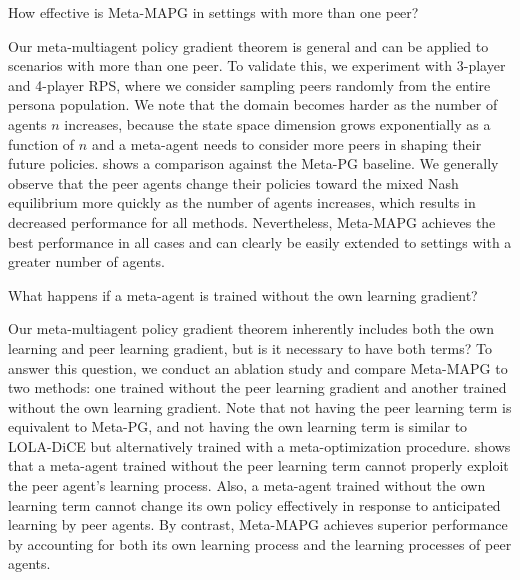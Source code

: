 \begin{question}
How effective is Meta-MAPG in settings with more than one peer?
\\[-2em]
\end{question}
Our meta-multiagent policy gradient theorem is general and can be applied to scenarios with more than one peer.
To validate this, we experiment with 3-player and 4-player RPS, where we consider sampling peers randomly from the entire persona population. 
We note that the domain becomes harder as the number of agents $n$ increases, because the state space dimension grows exponentially as a function of $n$ and a meta-agent needs to consider more peers in shaping their future policies. 
 shows a comparison against the Meta-PG baseline. 
We generally observe that the peer agents change their policies toward the mixed Nash equilibrium more quickly as the number of agents increases, which results in decreased performance for all methods. 
Nevertheless, Meta-MAPG achieves the best performance in all cases and can clearly be easily extended to settings with a greater number of agents.

\begin{question}
What happens if a meta-agent is trained without the own learning gradient?
\\[-2em]
\end{question}
Our meta-multiagent policy gradient theorem inherently includes both the own learning and peer learning gradient, but is it necessary to have both terms?
To answer this question, we conduct an ablation study and compare Meta-MAPG to two methods: one trained without the peer learning gradient and another trained without the own learning gradient. 
Note that not having the peer learning term is equivalent to Meta-PG, and not having the own learning term is similar to LOLA-DiCE but alternatively trained with a meta-optimization procedure.  shows that a meta-agent trained without the peer learning term cannot properly exploit the peer agent's learning process. 
Also, a meta-agent trained without the own learning term cannot change its own policy effectively in response to anticipated learning by peer agents.
By contrast, Meta-MAPG achieves superior performance by accounting for both its own learning process and the learning processes of peer agents.


